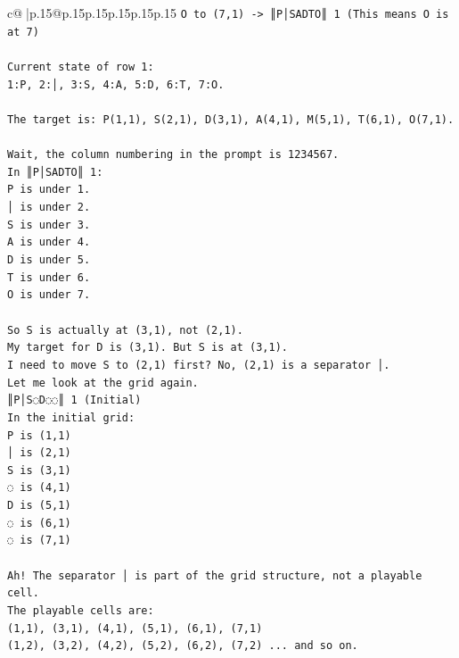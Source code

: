 \documentclass{article}
\begin{document}
{\begin{supertabular}{c@{$\;$}|p{.15\linewidth}@{}p{.15\linewidth}p{.15\linewidth}p{.15\linewidth}p{.15\linewidth}p{.15\linewidth}}
{{{\texttt{O to (7,1) {-}> ║P│SADTO║ 1 (This means O is at 7)} \\
\\ 
\texttt{Current state of row 1:} \\
\texttt{1:P, 2:│, 3:S, 4:A, 5:D, 6:T, 7:O.} \\
\\ 
\texttt{The target is: P(1,1), S(2,1), D(3,1), A(4,1), M(5,1), T(6,1), O(7,1).} \\
\\ 
\texttt{Wait, the column numbering in the prompt is  1234567.} \\
\texttt{In ║P│SADTO║ 1:} \\
\texttt{P is under 1.} \\
\texttt{│ is under 2.} \\
\texttt{S is under 3.} \\
\texttt{A is under 4.} \\
\texttt{D is under 5.} \\
\texttt{T is under 6.} \\
\texttt{O is under 7.} \\
\\ 
\texttt{So S is actually at (3,1), not (2,1).} \\
\texttt{My target for D is (3,1). But S is at (3,1).} \\
\texttt{I need to move S to (2,1) first? No, (2,1) is a separator │.} \\
\texttt{Let me look at the grid again.} \\
\texttt{║P│S◌D◌◌║ 1 (Initial)} \\
\texttt{In the initial grid:} \\
\texttt{P is (1,1)} \\
\texttt{│ is (2,1)} \\
\texttt{S is (3,1)} \\
\texttt{◌ is (4,1)} \\
\texttt{D is (5,1)} \\
\texttt{◌ is (6,1)} \\
\texttt{◌ is (7,1)} \\
\\ 
\texttt{Ah! The separator │ is part of the grid structure, not a playable cell.} \\
\texttt{The playable cells are:} \\
\texttt{(1,1), (3,1), (4,1), (5,1), (6,1), (7,1)} \\
\texttt{(1,2), (3,2), (4,2), (5,2), (6,2), (7,2) ... and so on.} \\
}}}
\end{supertabular}}
\end{document}
